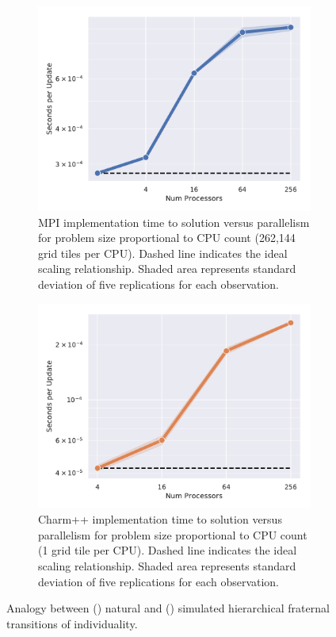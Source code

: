 
\begin{figure}
\begin{subfigure}[b]{0.5\textwidth}
\includegraphics[width=\textwidth]{img/MPIWeak}
\caption{
MPI implementation time to solution versus parallelism for problem size proportional to CPU count (262,144 grid tiles per CPU).
Dashed line indicates the ideal scaling relationship.
Shaded area represents standard deviation of five replications for each observation.
}
\label{fig:mpi_weak}
\end{subfigure}
\begin{subfigure}[b]{0.5\textwidth}
  \includegraphics[width=\textwidth]{img/CharmWeak}
\caption{
Charm++ implementation time to solution versus parallelism for problem size proportional to CPU count (1 grid tile per CPU).
Dashed line indicates the ideal scaling relationship.
Shaded area represents standard deviation of five replications for each observation.
}
\label{fig:charm_weak}
\end{subfigure}
\caption{
Analogy between () natural and () simulated hierarchical fraternal transitions of individuality.
}
\end{figure}
